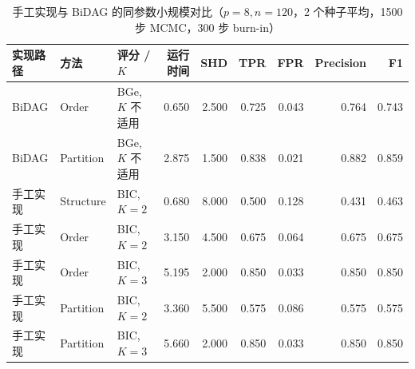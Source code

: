 \begin{table}[htbp]
\centering
\small
\setlength{\tabcolsep}{4pt}
\caption{手工实现与 BiDAG 的同参数小规模对比（$p=8,n=120$，2 个种子平均，1500 步 MCMC，300 步 burn-in）}
\label{tab:manual_bidag_compare}
\begin{tabular}{lllrrrrrr}
\toprule
实现路径 & 方法 & 评分 / $K$ & 运行时间 & SHD & TPR & FPR & Precision & F1 \\
\midrule
BiDAG & Order & BGe, $K$ 不适用 & 0.650 & 2.500 & 0.725 & 0.043 & 0.764 & 0.743 \\
BiDAG & Partition & BGe, $K$ 不适用 & 2.875 & 1.500 & 0.838 & 0.021 & 0.882 & 0.859 \\
手工实现 & Structure & BIC, $K=2$ & 0.680 & 8.000 & 0.500 & 0.128 & 0.431 & 0.463 \\
手工实现 & Order & BIC, $K=2$ & 3.150 & 4.500 & 0.675 & 0.064 & 0.675 & 0.675 \\
手工实现 & Order & BIC, $K=3$ & 5.195 & 2.000 & 0.850 & 0.033 & 0.850 & 0.850 \\
手工实现 & Partition & BIC, $K=2$ & 3.360 & 5.500 & 0.575 & 0.086 & 0.575 & 0.575 \\
手工实现 & Partition & BIC, $K=3$ & 5.660 & 2.000 & 0.850 & 0.033 & 0.850 & 0.850 \\
\bottomrule
\end{tabular}
\end{table}
